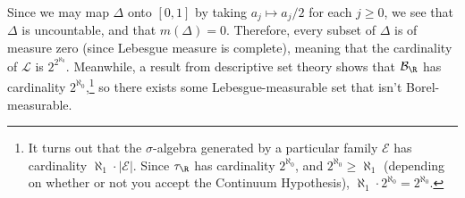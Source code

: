 \documentclass[10pt]{mypackage}
\begin{document}
Since we may map $\Delta$ onto $[0,1]$ by taking $a_j \mapsto a_j/2$ for each $j\geq 0$, we see that $\Delta$ is uncountable, and that $m(\Delta) = 0$. Therefore, every subset of $\Delta$ is of measure zero (since Lebesgue measure is complete), meaning that the cardinality of $\mathcal{L}$ is $2^{2^{\aleph_0}}$. Meanwhile, a result from descriptive set theory shows that $\mathcal{B}_{\R}$ has cardinality $2^{\aleph_0}$,\footnote{It turns out that the $\sigma$-algebra generated by a particular family $\mathcal{E}$ has cardinality $\aleph_1\cdot \left\vert \mathcal{E} \right\vert$. Since $\tau_{\R}$ has cardinality $2^{\aleph_0}$, and $2^{\aleph_0}\geq \aleph_1$ (depending on whether or not you accept the Continuum Hypothesis), $\aleph_1\cdot 2^{\aleph_0} = 2^{\aleph_0}$.} so there exists some Lebesgue-measurable set that isn't Borel-measurable.
%
%
%
\end{document}
